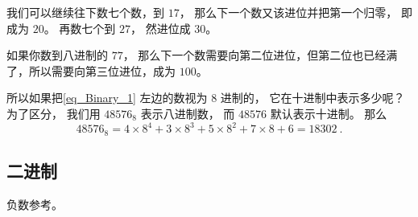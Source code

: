 我们可以继续往下数七个数，到 $17$， 那么下一个数又该进位并把第一个归零， 即成为 $20$。 再数七个到 $27$， 然进位成 $30$。

如果你数到八进制的 $77$， 那么下一个数需要向第二位进位，但第二位也已经满了，所以需要向第三位进位，成为 $100$。

所以如果把\autoref{eq_Binary_1} 左边的数视为 $8$ 进制的， 它在十进制中表示多少呢？ 为了区分， 我们用 $48576_\text{8}$ 表示八进制数， 而 $48576$ 默认表示十进制。 那么
\begin{equation}
48576_\text{8} = 4\times 8^{4} + 3\times 8^{3} + 5\times 8^{2} + 7\times 8 + 6 = 18302~.
\end{equation}


\subsection{二进制}

负数参考。
